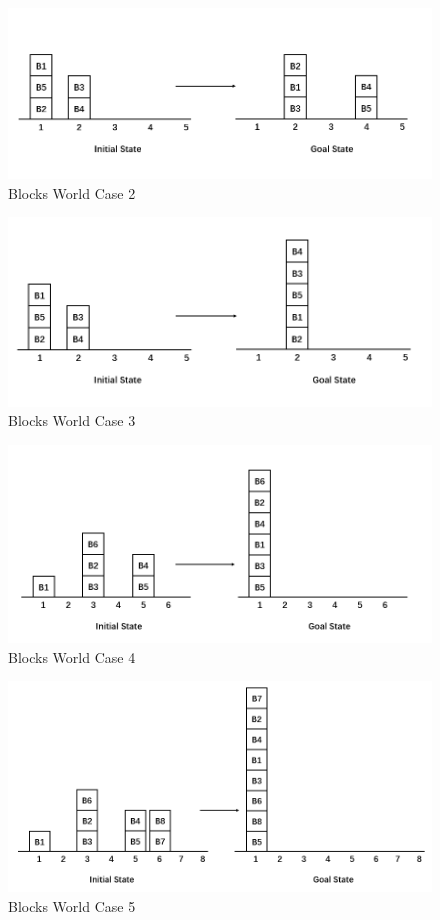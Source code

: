 ﻿\documentclass[a4paper, 11pt]{article}
\begin{document}
\begin{figure}[htbp]
  \centering
  \includegraphics[width=17cm]{Pic/blocks2}
  \caption{Blocks World Case 2}
  \label{fig:blocks2}
\end{figure}\begin{figure}[htbp]
  \centering
  \includegraphics[width=15cm]{Pic/blocks3}
  \caption{Blocks World Case 3}
  \label{fig:blocks3}
\end{figure}\begin{figure}[ht]
  \centering
  \includegraphics[width=15cm]{Pic/blocks4}
  \caption{Blocks World Case 4}
  \label{fig:blocks4}
\end{figure}\begin{figure}[ht]
  \centering
  \includegraphics[width=13cm]{Pic/blocks5}
  \caption{Blocks World Case 5}
  \label{fig:blocks5}
\end{figure}
\end{document}

